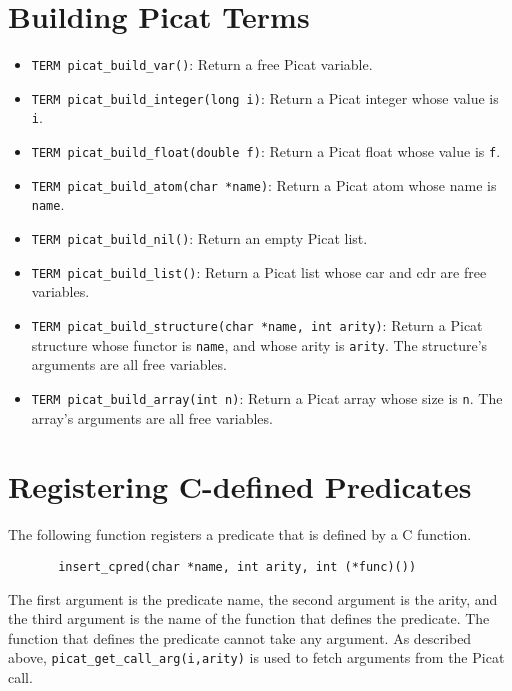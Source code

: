 \section{Building Picat Terms}
\begin{itemize}
\item \texttt{TERM picat\_build\_var()}: Return a free Picat variable.

\item \texttt{TERM picat\_build\_integer(long i)}: Return a Picat integer whose value is \texttt{i}.

\item \texttt{TERM picat\_build\_float(double f)}: Return a Picat float whose value is \texttt{f}.

\item \texttt{TERM picat\_build\_atom(char *name)}: Return a Picat atom whose name is \texttt{name}.

\item \texttt{TERM picat\_build\_nil()}: Return an empty Picat list.

\item \texttt{TERM picat\_build\_list()}: Return a Picat list whose car and cdr are free variables.

\item \texttt{TERM picat\_build\_structure(char *name, int arity)}: Return a Picat structure whose functor is \texttt{name}, and whose arity is \texttt{arity}.  The structure's arguments are all free variables.

\item \texttt{TERM picat\_build\_array(int n)}: Return a Picat array whose size is \texttt{n}.  The array's arguments are all free variables.
\end{itemize}

\section{Registering C-defined Predicates}
The following function registers a predicate that is defined by a C function.
\begin{verbatim}
       insert_cpred(char *name, int arity, int (*func)())
\end{verbatim}
The first argument is the predicate name, the second argument is the arity, and the third argument is the name of the function that defines the predicate. The function that defines the predicate cannot take any argument. As described above, \texttt{picat\_get\_call\_arg(i,arity)} is used to fetch arguments from the Picat call.

